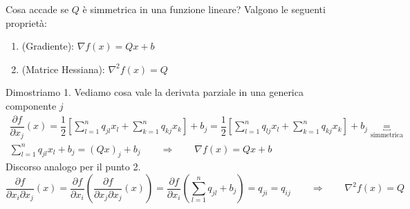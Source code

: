 \begin{observation}
\label{obs:gradiente-hessiana-funzione-quadratica}
Cosa accade se $Q$ \`e simmetrica in una funzione lineare?
Valgono le seguenti propriet\`a:
\begin{enumerate}
\item (Gradiente): $\nabla f(x) = Qx + b$
\item(Matrice Hessiana): $\nabla^{2}f(x) = Q$
\end{enumerate}
Dimostriamo 1. Vediamo cosa vale la derivata parziale in una generica
componente $j$
$$
\begin{array}{c}
\dfrac{\partial f}{\partial x_j}(x) =
\dfrac{1}{2}
\left[\displaystyle \sum_{l=1}^{n} q_{jl}x_l 
+
\sum_{k=1}^{n} q_{kj}x_k
\right] + b_j =
\dfrac{1}{2}
\left[\displaystyle \sum_{l=1}^{n} q_{lj}x_l 
+
\sum_{k=1}^{n} q_{kj}x_k
\right] + b_j \underbracket{=}_{\text{simmetrica}} \\
\displaystyle \sum_{l=1}^{n} q_{jl}x_l + b_j =
(Qx)_j + b_j  \qquad \Longrightarrow \qquad 
\nabla f(x) = Qx + b
\end{array}
$$
Discorso analogo per il punto 2.
$$
\dfrac{\partial f}{\partial x_i \partial x_j}(x) 
= 
\dfrac{\partial f}{\partial x_i}
\left(\dfrac{\partial f}{\partial x_j \partial x_j}(x) 
\right)
=
\dfrac{\partial f}{\partial x_i}
\left(
\displaystyle \sum_{l=1}^{n} q_{jl} + b_j 
\right) = q_{ji} = q_{ij}
\qquad \Longrightarrow \qquad \nabla^{2}f(x) = Q
$$
\end{observation}

